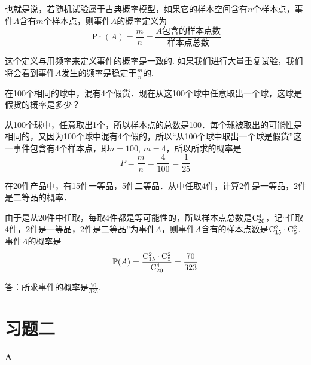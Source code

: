 也就是说，若随机试验属于古典概率模型，如果它的样本空间含有$n$个样本点，事件$A$含有$m$个样本点，则事件$A$的概率定义为
\begin{equation}
    \Pr(A)=\frac{m}{n}=\frac{\text{$A$包含的样本点数}}{\text{样本点总数}}\tag{1}
\end{equation}

这个定义与用频率来定义事件的概率是一致的. 如果我们进行大量重复试验，我们将会看到事件$A$发生的频率是稳定于$\frac{m}{n}$的.

\begin{example}
    在100个相同的球中，混有4个假货．现在从这100个球中任意取出一个球，这球是假货的概率是多少？
\end{example}

\begin{solution}
    从100个球中，任意取出1个，所以样本点的总数是100．每个球被取出的可能性是相同的，又因为100个球中混有4个假的，所以“从100个球中取出一个球是假货”这一事件包含有4个样本点，即$n=100$, $m=4$，所以所求的概率是
\[P=\frac{m}{n}=\frac{4}{100}=\frac{1}{25}\]
\end{solution}

\begin{example}
    在20件产品中，有15件一等品，5件二等品．从中任取4件，计算2件是一等品，2件是二等品的概率．
\end{example}

\begin{solution}
    由于是从20件中任取，每取4件都是等可能性的，所以样本点总数是${\rm C}_{20}^4$，记“任取4件，2件是一等品，2件是二等品”为事件$A$，则事件$A$含有的样本点数是${\rm C}_{15}^2\cdot {\rm C}_{5}^2$. 事件$A$的概率是
\[\Pr(A) = \frac{{\rm C}_{15}^2\cdot {\rm C}_{5}^2}{{\rm C}_{20}^4}=\frac{70}{323}\]

答：所求事件的概率是$\frac{70}{323}$.
\end{solution}

\section*{习题二}

\begin{center}
    \bfseries A
\end{center}


